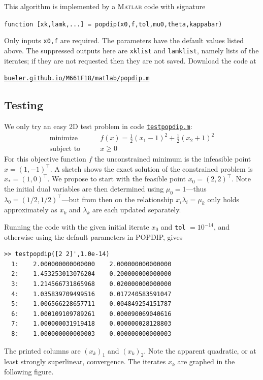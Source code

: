 \documentclass[11pt]{article}
\newcommand{\Matlab}{\textsc{Matlab}\xspace}
\begin{document}
This algorithm is implemented by a \Matlab code with signature
\begin{center}
\texttt{function [xk,lamk,...] = popdip(x0,f,tol,mu0,theta,kappabar)}
\end{center}
Only inputs \texttt{x0,f} are required.  The parameters have the default values listed above.  The suppressed outputs here are \texttt{xklist} and \texttt{lamklist}, namely lists of the iterates; if they are not requested then they are not saved.  Download the code at
\begin{center}
    \href{http://bueler.github.io/M661F18/matlab/popdip.m}{\texttt{bueler.github.io/M661F18/matlab/popdip.m}}
\end{center}


\subsection*{Testing}

We only try an easy 2D test problem in code \href{http://bueler.github.io/M661F18/matlab/testpopdip.m}{\texttt{testpopdip.m}}:
\begin{equation}
\begin{matrix}
\text{minimize} \qquad & f(x) = \frac{1}{2} (x_1-1)^2 + \frac{1}{2} (x_2+1)^2 \\
\text{subject to} \qquad & x \ge 0
\end{matrix} \label{testoneproblem}
\end{equation}
For this objective function $f$ the unconstrained minimum is the infeasible point $\hat x =(1,-1)^\top$.  A sketch shows the exact solution of the constrained problem is $x_*=(1,0)^\top$.  We propose to start with the feasible point $x_0=(2,2)^\top$.  Note the initial dual variables are then determined using $\mu_0=1$---thus $\lambda_0=(1/2,1/2)^\top$---but from then on the relationship $x_i\lambda_i=\mu_k$ only holds approximately as $x_k$ and $\lambda_k$ are each updated separately.

Running the code with the given initial iterate $x_0$ and \texttt{tol} $=10^{-14}$, and otherwise using the default parameters in POPDIP, gives
\begin{Verbatim}[fontsize=\small]
>> testpopdip([2 2]',1.0e-14)
  1:    2.000000000000000    2.000000000000000
  2:    1.453253013076204    0.200000000000000
  3:    1.214566731865968    0.020000000000000
  4:    1.035839709499516    0.017240583591047
  5:    1.006566228657711    0.004849254151787
  6:    1.000109109789261    0.000090069040616
  7:    1.000000031919418    0.000000028128803
  8:    1.000000000000003    0.000000000000003
\end{Verbatim}
The printed columns are $(x_k)_1$ and $(x_k)_2$.  Note the apparent quadratic, or at least strongly superlinear, convergence.  The iterates $x_k$ are graphed in the following figure.
\end{document}
